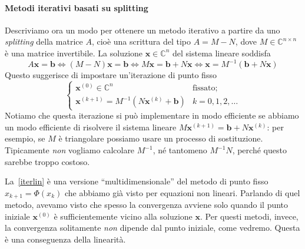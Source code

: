 \documentclass[a4paper]{report}
\theoremstyle{definition}
\theoremstyle{remark}
\newcommand{\x}{\mathbf{x}}
\renewcommand{\b}{\mathbf{b}}
\begin{document}
\paragraph{Metodi iterativi basati su splitting} Descriviamo ora un modo per ottenere un metodo iterativo a partire da uno \emph{splitting} della matrice $A$, cioè una scrittura del tipo $A = M - N$, dove $M\in\mathbb{C}^{n\times n}$ è una matrice invertibile. La soluzione $\x\in\mathbb{C}^{n}$ del sistema lineare soddisfa
\begin{equation} \label{solsistema}
    A\x = \b \iff (M-N)\x=\b \iff M\x = \b + N\x  \iff \x = M^{-1}(\b + N\x)
\end{equation}
Questo suggerisce di impostare un'iterazione di punto fisso
\begin{equation} \label{iterlin}
    \begin{cases}
    \x^{(0)} \in \mathbb{C}^n & \text{fissato};\\
    \x^{(k+1)} = M^{-1}(N\x^{(k)} + \mathbf{b}) & k=0,1,2,\dots
    \end{cases}
\end{equation}
Notiamo che questa iterazione si può implementare in modo efficiente se abbiamo un modo efficiente di risolvere il sistema lineare $M\x^{(k+1)} = \b + N\x^{(k)}$: per esempio, se $M$ è triangolare possiamo usare un processo di sostituzione. Tipicamente \emph{non} vogliamo calcolare $M^{-1}$, né tantomeno $M^{-1}N$, perché questo sarebbe troppo costoso.

La~\eqref{iterlin} è una versione ``multidimensionale'' del metodo di punto fisso $x_{k+1} = \Phi(x_k)$ che abbiamo già visto per equazioni non lineari. Parlando di quel metodo, avevamo visto che spesso la convergenza avviene solo quando il punto iniziale $\x^{(0)}$ è sufficientemente vicino alla soluzione $\x$. Per questi metodi, invece, la convergenza solitamente \emph{non} dipende dal punto iniziale, come vedremo. Questa è una conseguenza della linearità.
\end{document}
